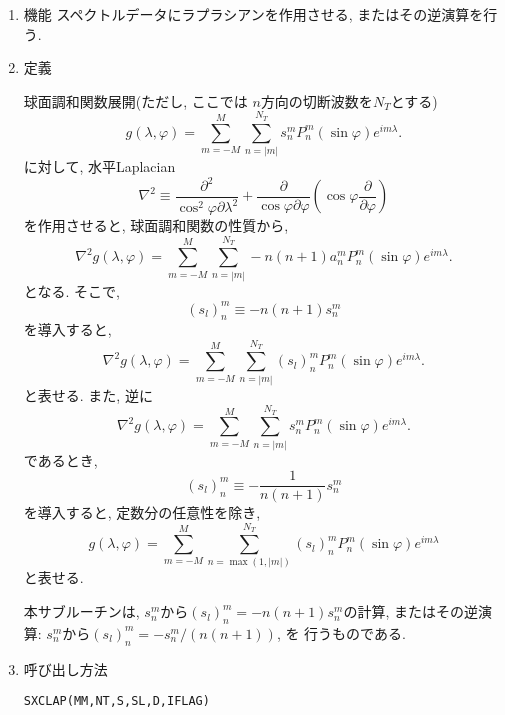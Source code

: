 \documentclass[a4j]{jsarticle}
\begin{document}
\begin{enumerate}

\item 機能 
スペクトルデータにラプラシアンを作用させる, またはその逆演算を行う.

\item 定義

球面調和関数展開(ただし, ここでは $n$方向の切断波数を$N_T$とする)
\begin{equation}
g(\lambda,\varphi)=\sum^M_{m=-M}\sum^{N_T}_{n=|m|}
s^m_nP^m_n(\sin\varphi)e^{im\lambda}.
\end{equation}
に対して, 水平Laplacian
\begin{equation}
\nabla^2\equiv
\frac{\partial^2}{\cos^2\varphi\partial\lambda^2}
+\frac{\partial}{\cos\varphi\partial\varphi}\left(\cos\varphi\frac{\partial}{\partial\varphi}\right)
\end{equation}
を作用させると, 球面調和関数の性質から, 
\begin{equation}
\nabla^2 g(\lambda,\varphi)
=\sum^M_{m=-M}\sum^{N_T}_{n=|m|}-n(n+1)a^m_nP^m_n(\sin\varphi)e^{im\lambda}.
\end{equation}
となる. そこで,
\begin{equation}
(s_l)^m_n\equiv -n(n+1)s^m_n
\end{equation}
を導入すると, 
\begin{equation}
\nabla^2 g(\lambda,\varphi)
=\sum^M_{m=-M}\sum^{N_T}_{n=|m|}(s_l)^m_nP^m_n(\sin\varphi)e^{im\lambda}.
\end{equation}
と表せる. 
また, 逆に
\begin{equation}
\nabla^2 g(\lambda,\varphi)
=\sum^M_{m=-M}\sum^{N_T}_{n=|m|}s^m_nP^m_n(\sin\varphi)e^{im\lambda}.
\end{equation}
であるとき, 
\begin{equation}
(s_l)^m_n\equiv -\frac1{n(n+1)}s^m_n
\end{equation}
を導入すると, 定数分の任意性を除き,
\begin{equation}
g(\lambda,\varphi)
=\sum^M_{m=-M}\sum^{N_T}_{n=\max(1,|m|)}
(s_l)^m_nP^m_n(\sin\varphi)e^{im\lambda}
\end{equation}
と表せる. 

本サブルーチンは,
$s^m_n$から$(s_l)^m_n = -n(n+1)s^m_n$の計算, 
またはその逆演算: $s^m_n$から$(s_l)^m_n = -s^m_n/(n(n+1))$, を
行うものである. 

\item 呼び出し方法 
    
\texttt{SXCLAP(MM,NT,S,SL,D,IFLAG)}
  

\end{enumerate}
\end{document}
